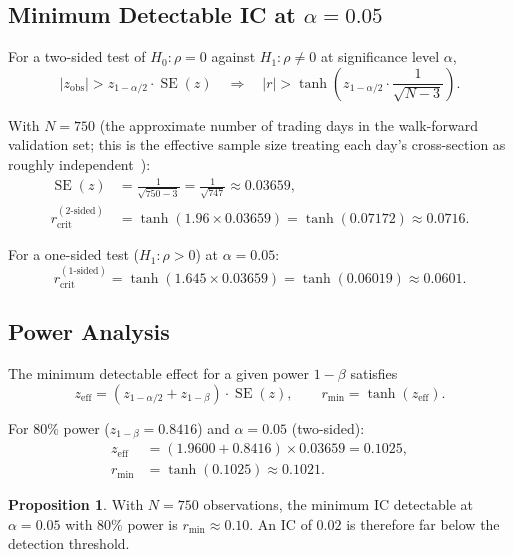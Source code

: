 \documentclass[11pt,a4paper]{article}
\theoremstyle{definition}
\newtheorem{proposition}{Proposition}[section]
\newcommand{\SE}{\operatorname{SE}}
\newcommand{\Ho}{H_{0}}
\newcommand{\Ha}{H_{1}}
\begin{document}
\subsection{Minimum Detectable IC at \texorpdfstring{$\alpha = 0.05$}{alpha = 0.05}}

For a two-sided test of $\Ho: \rho = 0$ against $\Ha: \rho \neq 0$ at
significance level $\alpha$,
\begin{equation}
    |z_{\text{obs}}| > z_{1-\alpha/2} \cdot \SE(z)
    \quad\Longrightarrow\quad
    |r| > \tanh\!\left(z_{1-\alpha/2} \cdot \frac{1}{\sqrt{N-3}}\right).
\end{equation}

With $N = 750$ (the approximate number of trading days in the
walk-forward validation set; this is the effective sample size treating
each day's cross-section as roughly independent~\cite{efron2012large}):
\begin{align}
    \SE(z) &= \frac{1}{\sqrt{750-3}} = \frac{1}{\sqrt{747}} \approx 0.03659, \\[4pt]
    r_{\text{crit}}^{(2\text{-sided})} &=
        \tanh\!\left(1.96 \times 0.03659\right)
        = \tanh(0.07172) \approx 0.0716.
\end{align}

For a one-sided test ($\Ha: \rho > 0$) at $\alpha = 0.05$:
\begin{equation}
    r_{\text{crit}}^{(1\text{-sided})} =
        \tanh\!\left(1.645 \times 0.03659\right)
        = \tanh(0.06019) \approx 0.0601.
\end{equation}

\subsection{Power Analysis}

The minimum detectable effect for a given power $1-\beta$ satisfies
\begin{equation}
    z_{\text{eff}} = (z_{1-\alpha/2} + z_{1-\beta}) \cdot \SE(z),
    \qquad r_{\text{min}} = \tanh(z_{\text{eff}}).
\end{equation}

For $80\%$ power ($z_{1-\beta} = 0.8416$) and $\alpha = 0.05$ (two-sided):
\begin{align}
    z_{\text{eff}} &= (1.9600 + 0.8416) \times 0.03659 = 0.1025, \\
    r_{\text{min}} &= \tanh(0.1025) \approx 0.1021.
\end{align}
\begin{proposition}
    With $N = 750$ observations, the minimum IC detectable at $\alpha = 0.05$
    with $80\%$ power is $r_{\text{min}} \approx 0.10$.  An IC of $0.02$ is
    therefore far below the detection threshold.
\end{proposition}
\end{document}
